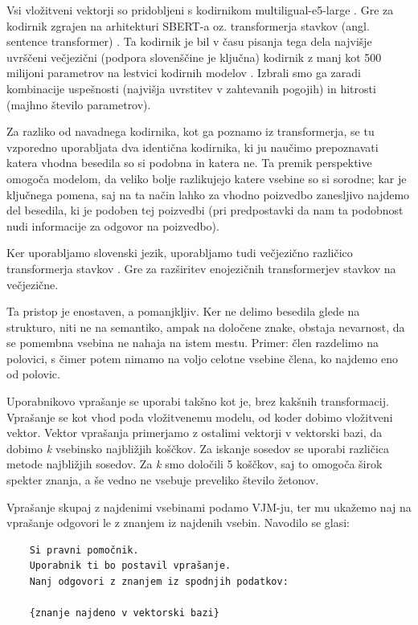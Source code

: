 \documentclass[a4paper,12pt,openright]{book}
\begin{document}
Vsi vložitveni vektorji so pridobljeni s kodirnikom multiligual-e5-large \cite{multilingual-e5-large}. Gre za kodirnik zgrajen na arhitekturi SBERT-a oz. transformerja stavkov (angl. sentence transformer) \cite{sbert}. Ta kodirnik je bil v času pisanja tega dela najvišje uvrščeni večjezični (podpora slovenščine je ključna) kodirnik z manj kot 500 milijoni parametrov na lestvici kodirnih modelov \cite{mteb}. Izbrali smo ga zaradi kombinacije uspešnosti (najvišja uvrstitev v zahtevanih pogojih) in hitrosti (majhno število parametrov).

Za razliko od navadnega kodirnika, kot ga poznamo iz transformerja, se tu vzporedno uporabljata dva identična kodirnika, ki ju naučimo prepoznavati katera vhodna besedila so si podobna in katera ne. Ta premik perspektive omogoča modelom, da veliko bolje razlikujejo katere vsebine so si sorodne; kar je ključnega pomena, saj na ta način lahko za vhodno poizvedbo zanesljivo najdemo del besedila, ki je podoben tej poizvedbi (pri predpostavki da nam ta podobnost nudi informacije za odgovor na poizvedbo).

Ker uporabljamo slovenski jezik, uporabljamo tudi večjezično različico transformerja stavkov \cite{multilingual-sbert}. Gre za razširitev enojezičnih transformerjev stavkov na večjezične.

Ta pristop je enostaven, a pomanjkljiv. Ker ne delimo besedila glede na strukturo, niti ne na semantiko, ampak na določene znake, obstaja nevarnost, da se pomembna vsebina ne nahaja na istem mestu. Primer: člen razdelimo na polovici, s čimer potem nimamo na voljo celotne vsebine člena, ko najdemo eno od polovic.

Uporabnikovo vprašanje se uporabi takšno kot je, brez kakšnih transformacij. Vprašanje se kot vhod poda vložitvenemu modelu, od koder dobimo vložitveni vektor. Vektor vprašanja primerjamo z ostalimi vektorji v vektorski bazi, da dobimo \textit{k} vsebinsko najbližjih koščkov. Za iskanje sosedov se uporabi različica metode najbližjih sosedov. Za \textit{k} smo določili 5 koščkov, saj to omogoča širok spekter znanja, a še vedno ne vsebuje preveliko število žetonov.

Vprašanje skupaj z najdenimi vsebinami podamo VJM-ju, ter mu ukažemo naj na vprašanje odgovori le z znanjem iz najdenih vsebin. Navodilo se glasi:

\begin{verbatim}
    Si pravni pomočnik.
    Uporabnik ti bo postavil vprašanje.
    Nanj odgovori z znanjem iz spodnjih podatkov:

    {znanje najdeno v vektorski bazi}
\end{verbatim}
\end{document}
